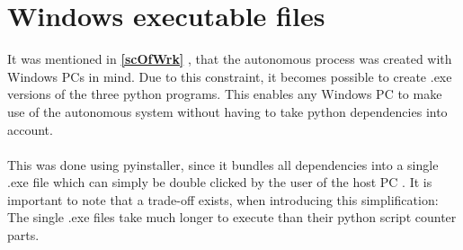 \section{Windows executable files}
\label{exe}
It was mentioned in \textbf{\ref{scOfWrk} }, that the autonomous process was created with Windows PCs in mind. Due to this constraint, it becomes possible to create .exe versions of the three python programs. This enables any Windows PC to make use of the autonomous system without having to take python dependencies into account.
\\\\
This was done using pyinstaller, since it bundles all dependencies into a single .exe file which can simply be double clicked by the user of the host PC \cite{that}. It is important to note that a trade-off exists, when introducing this simplification: The single .exe files take much longer to execute than their python script counter parts.
